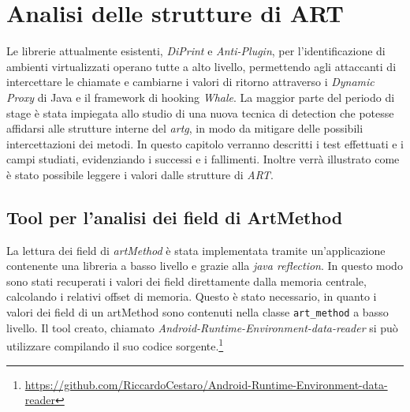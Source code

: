 
\chapter{Analisi delle strutture di ART}
\label{chap:analisi_art}

Le librerie attualmente esistenti, \emph{DiPrint} e \emph{Anti-Plugin}, per l'identificazione di ambienti virtualizzati operano tutte a alto livello, permettendo agli attaccanti di intercettare le chiamate e cambiarne i valori di ritorno attraverso i \emph{Dynamic Proxy} di Java e il framework di hooking \emph{Whale}.
La maggior parte del periodo di stage è stata impiegata allo studio di una nuova tecnica di detection che potesse affidarsi alle strutture interne del \emph{\gls{artg}}, in modo da mitigare delle possibili intercettazioni dei metodi.
In questo capitolo verranno descritti i test effettuati e i campi studiati, evidenziando i successi e i fallimenti.
Inoltre verrà illustrato come è stato possibile leggere i valori dalle strutture di \emph{ART}.

\newpage

\section{Tool per l'analisi dei field di ArtMethod}

La lettura dei field di \emph{artMethod} è stata implementata tramite un'applicazione contenente una libreria a basso livello e grazie alla \emph{java reflection}. In questo modo sono stati recuperati i valori dei field direttamente dalla memoria centrale, calcolando i relativi offset di memoria.
Questo è stato necessario, in quanto i valori dei field di un artMethod sono contenuti nella classe \texttt{art\_method} a basso livello.
Il tool creato, chiamato \emph{Android-Runtime-Environment-data-reader} si può utilizzare compilando il suo codice sorgente.\footnote{\url{https://github.com/RiccardoCestaro/Android-Runtime-Environment-data-reader}}

